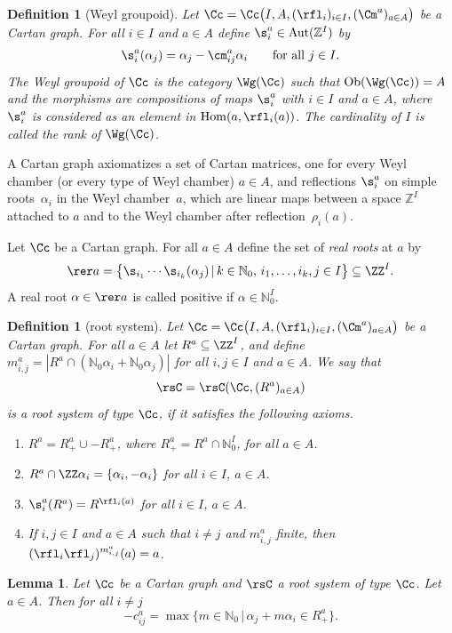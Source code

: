 \documentclass[10pt,a4paper]{amsart}
\numberwithin{equation}{section}
\newtheorem{lem}[teo]{Lemma}
\newtheorem{defin}[teo]{Definition}
\newcommand{\N}{\mathbb{N}}
\newcommand{\Z}{\mathbb{Z}}
\begin{document}
\begin{defin}[Weyl groupoid]
	Let $\Cc = \Cc \big(I,A,(\rfl _i)_{i \in I}, (\Cm ^a)_{a \in A}\big)$ be a
	Cartan graph. For all $i \in I$ and $a \in A$ define $\s _i^a \in
	\operatorname{Aut}(\Z ^I)$ by
	\begin{align*}
	\s _i^a (\alpha_j) = \alpha_j - \cm _{ij}^a \alpha_i \qquad
	\text{for all $j \in I$.}
	\end{align*}
	The \textit{Weyl groupoid of} $\Cc $
	is the category $\Wg (\Cc )$ such that $\operatorname{Ob} (\Wg (\Cc ))=A$ and
	the morphisms are compositions of maps
	$\s _i^a$ with $i\in I$ and $a\in A$,
	where $\s _i^a$ is considered as an element in $\operatorname{Hom} (a,\rfl _i(a))$.
	The cardinality of $I$ is called the \textit{rank of} $\Wg (\Cc )$.
\end{defin}
A Cartan graph axiomatizes a set of Cartan matrices, one for every Weyl chamber (or every type of Weyl chamber) $a\in A$, and reflections $\s_i^a$ on simple roots~$\alpha_i$ in the Weyl chamber~$a$, which are linear maps between a space $\Z^I$ attached to $a$ and to the Weyl chamber after reflection~$\rho_i(a)$.

Let $\Cc $ be a Cartan graph. For all $a\in A$ define the set of \emph{real roots} at $a$ by
\[ \rer a=\big\{ \s _{i_1}\cdots \s_{i_k}(\alpha_j)\,|\,
k\in \N _0,\,i_1,\dots,i_k,j\in I\big\}\subseteq \ZZ ^I.\]
A real root $\alpha\in \rer a$ is called positive if $\alpha\in \N _0^I$.

\begin{defin}[root system]
	Let $\Cc =\Cc \big(I,A,(\rfl _i)_{i\in I},(\Cm ^a)_{a\in A}\big)$ be a Cartan
	graph. For all $a\in A$ let $R^a\subseteq \ZZ ^I$, and define
	$m_{i,j}^a= |R^a \cap (\N_0 \alpha_i + \N_0 \alpha_j)|$ for all $i,j\in
	I$ and $a\in A$. We say that
	\[ \rsC = \rsC (\Cc, (R^a)_{a\in A}) \]
	is a \textit{root system of type} $\Cc $, if it satisfies the following
	axioms.
	\begin{enumerate}\itemsep=0pt
		\item[(R1)]
		$R^a=R^a_+\cup - R^a_+$, where $R^a_+=R^a\cap \N_0^I$, for all
		$a\in A$.
		\item[(R2)]
		$R^a\cap \ZZ\alpha_i=\{\alpha_i,-\alpha_i\}$ for all $i\in I$, $a\in A$.
		\item[(R3)]
		$\s _i^a(R^a) = R^{\rfl _i(a)}$ for all $i\in I$, $a\in A$.
		\item[(R4)]
		If $i,j\in I$ and $a\in A$ such that $i\not=j$ and $m_{i,j}^a$
		finite, then
		$(\rfl _i\rfl _j)^{m_{i,j}^a}(a)=a$.
	\end{enumerate}
\end{defin}
\begin{lem}
 Let $\Cc $ be a Cartan graph and $\rsC$ a root system of type $\Cc$. Let $a\in A$. Then for all $i\neq j$
 \[-c^a_{ij}=\max \big\{m\in\N_0\,|\,\alpha_j+m\alpha_i \in R^a_+\big\}.\]
\end{lem}
\end{document}
